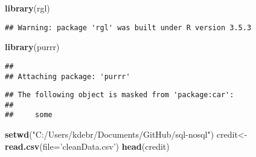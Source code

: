 \documentclass[]{article}
\newenvironment{Shaded}{\begin{snugshade}}{\end{snugshade}}
\newcommand{\KeywordTok}[1]{\textcolor[rgb]{0.13,0.29,0.53}{\textbf{#1}}}
\newcommand{\DataTypeTok}[1]{\textcolor[rgb]{0.13,0.29,0.53}{#1}}
\newcommand{\StringTok}[1]{\textcolor[rgb]{0.31,0.60,0.02}{#1}}
\newcommand{\NormalTok}[1]{#1}
\begin{document}
\begin{Shaded}
\begin{Highlighting}[]
\KeywordTok{library}\NormalTok{(rgl)}
\end{Highlighting}
\end{Shaded}

\begin{verbatim}
## Warning: package 'rgl' was built under R version 3.5.3
\end{verbatim}

\begin{Shaded}
\begin{Highlighting}[]
\KeywordTok{library}\NormalTok{(purrr)}
\end{Highlighting}
\end{Shaded}

\begin{verbatim}
## 
## Attaching package: 'purrr'
\end{verbatim}

\begin{verbatim}
## The following object is masked from 'package:car':
## 
##     some
\end{verbatim}

\begin{Shaded}
\begin{Highlighting}[]
\KeywordTok{setwd}\NormalTok{(}\StringTok{"C:/Users/kdebr/Documents/GitHub/sql-nosql"}\NormalTok{)}
\NormalTok{credit<-}\KeywordTok{read.csv}\NormalTok{(}\DataTypeTok{file=}\StringTok{'cleanData.csv'}\NormalTok{)}
\KeywordTok{head}\NormalTok{(credit)}
\end{Highlighting}
\end{Shaded}
\end{document}
